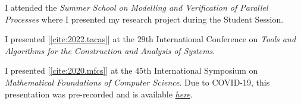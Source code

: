 \begin{itemize}

  I attended the \emph{Summer School on Modelling and Verification of Parallel
  Processes} where I presented my research project during the Student Session.


  I presented [\ref{cite:2022.tacas}] at the $29$th International Conference
  on \emph{Tools and Algorithms for the Construction and Analysis of Systems}.


  I presented [\ref{cite:2020.mfcs}] at the $45$th International Symposium on
  \emph{Mathematical Foundations of Computer Science}. Due to COVID-19, this
  presentation was pre-recorded and is available
  \href{https://youtu.be/CXC2UMi6hg0}{\emph{here}}. 
\end{itemize}
